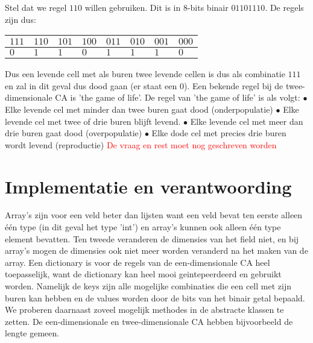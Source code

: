 \documentclass[12pt,a4paper]{article}
\begin{document}
Stel dat we regel $110$ willen gebruiken. Dit is in 8-bits binair $01101110$.
De regels zijn dus:
\begin{center}
\begin{tabular}{|m{0.6cm}|m{0.6cm}|m{0.6cm}|m{0.6cm}|m{0.6cm}|m{0.6cm}|m{0.6cm}|m{0.6cm}|}
    \hline
    $111$ & $110$ & $101$ & $100$ & $011$ & $010$ & $001$ & $000$ \\
    \hline
    $0$ & $1$ & $1$ & $0$ & $1$ & $1$ & $1$ & $0$ \\
    \hline
\end{tabular}
\end{center}
\vspace{10pt}
Dus een levende cell met als buren twee levende cellen is dus als combinatie $111$ en zal in dit geval dus dood gaan (er staat een $0$).
Een bekende regel bij de twee-dimensionale CA is 'the game of life'. 
\newline
De regel van 'the game of life' is als volgt:
\vspace{4pt}
\newline
$\bullet$ Elke levende cel met minder dan twee buren gaat dood (onderpopulatie) 
\newline 
$\bullet$ Elke levende cel met twee of drie buren blijft levend.
\newline
$\bullet$ Elke levende cel met meer dan drie buren gaat dood (overpopulatie)
\newline 
$\bullet$ Elke dode cel met precies drie buren wordt levend (reproductie) 
\newline
\vspace{4pt}
\textcolor{red}{De vraag en rest moet nog geschreven worden}


\section*{Implementatie en verantwoording}
Array's zijn voor een veld beter dan lijsten want een veld bevat ten eerste alleen één type (in dit geval het type 'int') 
en array's kunnen ook alleen één type element bevatten.  
Ten tweede veranderen de dimensies van het field niet, en bij array's mogen de dimensies ook niet meer worden veranderd na
het maken van de array. Een dictionary is voor de regels van de een-dimensionale CA heel toepasselijk, want 
de dictionary kan heel mooi geintepeerdeerd en gebruikt worden. 
Namelijk de keys zijn alle mogelijke combinaties die een cell met zijn buren kan hebben
en de values worden door de bits van het binair getal bepaald. 
We proberen daarnaast zoveel mogelijk methodes in de abstracte klassen te zetten.
De een-dimensionale en twee-dimensionale CA hebben bijvoorbeeld de lengte gemeen.   
\end{document}
